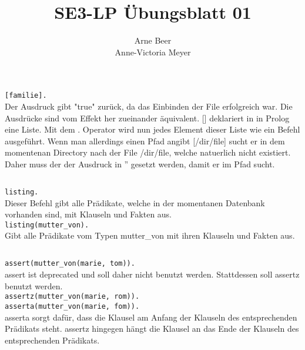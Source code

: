 \documentclass[11pt]{article}
\title{\textbf{SE3-LP Übungsblatt 01}}
\author{Arne Beer\\
		Anne-Victoria Meyer}
\date{}
\begin{document}
\maketitle
\flushleft
\onehalfspacing
\section{}
\subsection{}

\verb|[familie].| \\
 Der Ausdruck gibt "true" zurück, da das Einbinden der File erfolgreich war. Die Ausdrücke sind vom Effekt her zueinander äquivalent. [] deklariert in in Prolog eine Liste. Mit dem . Operator wird nun jedes Element dieser Liste wie ein Befehl ausgeführt. Wenn man allerdings einen Pfad angibt [/dir/file] sucht er in dem momentenan Directory nach der File /dir/file, welche natuerlich nicht existiert. Daher muss der der Ausdruck in '' gesetzt werden, damit er im Pfad sucht. 
\\

\subsection{} 
\verb|listing.| \\
Dieser Befehl gibt alle Prädikate, welche in der momentanen Datenbank vorhanden sind, mit Klauseln und Fakten aus.
\\

\verb|listing(mutter_von).| \\
Gibt alle Prädikate vom Typen mutter\_von mit ihren Klauseln und Fakten aus.
\\

\subsection{}
\verb|assert(mutter_von(marie, tom)).| \\
assert ist deprecated und soll daher nicht benutzt werden. Stattdessen soll assertz benutzt werden. \\ 
\verb|assertz(mutter_von(marie, rom)).| \\
\verb|asserta(mutter_von(marie, fom)).| \\

asserta sorgt dafür, dass die Klausel am Anfang der Klauseln des entsprechenden Prädikats steht. assertz hingegen hängt die Klausel an das Ende der Klauseln des entsprechenden Prädikats.
\\
\end{document}
